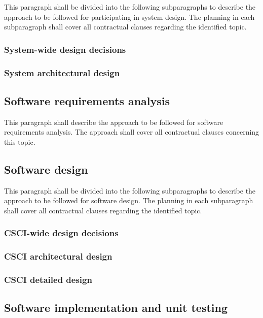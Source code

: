 This paragraph shall be divided into the following subparagraphs to
describe the approach to be followed for participating in system design.
The planning in each subparagraph shall cover all contractual clauses
regarding the identified topic.

\subsubsection{System-wide design decisions}
\subsubsection{System architectural design}

\subsection{Software requirements analysis}

This paragraph shall describe the approach to be followed for software
requirements analysis. The approach shall cover all contractual clauses
concerning this topic.

\subsection{Software design}

This paragraph shall be divided into the following subparagraphs to
describe the approach to be followed for software design. The planning
in each subparagraph shall cover all contractual clauses regarding the
identified topic.

\subsubsection{CSCI-wide design decisions}

\subsubsection{CSCI architectural design}

\subsubsection{CSCI detailed design}

\subsection{Software implementation and unit testing}

